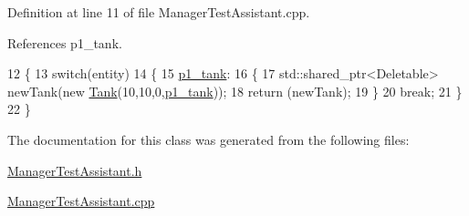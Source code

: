 Definition at line 11 of file Manager\-Test\-Assistant.\-cpp.



References p1\-\_\-tank.


\begin{DoxyCode}
12 \{
13     \textcolor{keywordflow}{switch}(entity)
14     \{
15         \hyperlink{Structures_8h_a6d8f83e710b27d4f86c45f0bb77066e3a31fa78b2b7dd774f5158a16ef230932e}{p1\_tank}:
16             \{
17                 std::shared\_ptr<Deletable> newTank(\textcolor{keyword}{new} \hyperlink{classTank}{Tank}(10,10,0,\hyperlink{Structures_8h_a6d8f83e710b27d4f86c45f0bb77066e3a31fa78b2b7dd774f5158a16ef230932e}{p1\_tank}));
18                 \textcolor{keywordflow}{return} (newTank);
19             \}
20         \textcolor{keywordflow}{break};
21     \}
22 \}
\end{DoxyCode}


The documentation for this class was generated from the following files\-:\begin{DoxyCompactItemize}
\item 
\hyperlink{ManagerTestAssistant_8h}{Manager\-Test\-Assistant.\-h}\item 
\hyperlink{ManagerTestAssistant_8cpp}{Manager\-Test\-Assistant.\-cpp}\end{DoxyCompactItemize}

